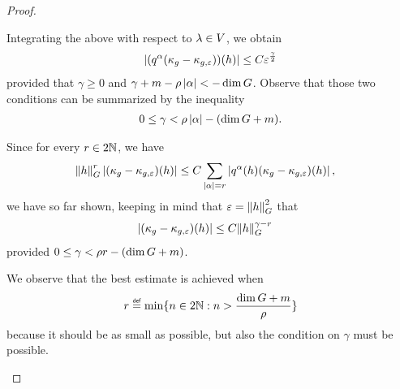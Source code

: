 \begin{proof}
\begin{description}
            Integrating the above with respect to $\lambda \in \VectorSpace$,
            we obtain
            \begin{align*}
                \abs {(q^\alpha(\kappa_g - \kappa_{g, \epsilon}))(h)}
                \leq C \epsilon^\frac \gamma 2
            \end{align*}
            provided that $\gamma \geq 0$ and $\gamma + m - \rho \abs \alpha < -\dim \Group$.
            Observe that those two conditions can be summarized by the inequality
            \begin{align*}
                0 \leq \gamma < \rho \abs \alpha - (\dim \Group + m).
            \end{align*}

            Since for every $r \in 2 \N$, we have
            \begin{align*}
                \norm [\Group] h^r \abs{(\kappa_g - \kappa_{g, \epsilon})(h)}
                &\leq C \sum_{\abs \alpha = r} \abs{q^\alpha(h) (\kappa_g - \kappa_{g, \epsilon})(h)},
            \end{align*}
            we have so far shown, keeping in mind that $\epsilon = \norm [\Group] h^2$ that
            \begin{align}
                \abs{(\kappa_g - \kappa_{g, \epsilon})(h)}
                &\leq C \norm [\Group] h^{\gamma - r}
                \label{eq:estimate_on_the_remainder}
            \end{align}
            provided $0 \leq \gamma < \rho r - (\dim \Group + m)$.

            We observe that the best estimate is achieved when
            \begin{align*}
                r \defeq \min \{n \in 2 \N : n > \frac{\dim \Group + m} \rho \}
            \end{align*}
            because it should be as small as possible,
            but also the condition on $\gamma$ must be possible.


\end{description}
\end{proof}
